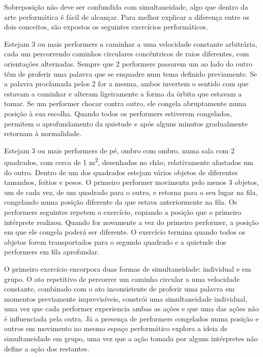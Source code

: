 \documentclass[../main.tex]{subfiles}
\begin{document}
Sobreposição não deve ser confundida com simultaneidade, algo que dentro da arte performática é fácil de alcançar. Para melhor explicar a diferença entre os dois conceitos, são expostos os seguintes exercícios performáticos.
\begin{performex}
    Estejam 3 ou mais performers a caminhar a uma velocidade constante arbitrária, cada um percorrendo caminhos circulares concêntricos de raios diferentes, com orientações alternadas. Sempre que 2 performers passarem um ao lado do outro têm de proferir uma palavra que se enquadre num tema definido previamente. Se a palavra proclamada pelos 2 for a mesma, ambos invertem o sentido com que estavam a caminhar e alteram ligeiramente a forma da órbita que estavam a tomar. Se um performer chocar contra outro, ele congela abruptamente numa posição à sua escolha. Quando todos os performers estiverem congelados, permitem o aprofundamento da quietude e após alguns minutos gradualmente retornam à normalidade.
\end{performex}
\begin{performex}
    Estejam 3 ou mais performers de pé, ombro com ombro, numa sala com 2 quadrados, com cerca de 1 m\textsuperscript{2}, desenhados no chão, relativamente afastados um do outro. Dentro de um dos quadrados estejam vários objetos de diferentes tamanhos, feitios e pesos. O primeiro performer movimenta pelo menos 3 objetos, um de cada vez, de um quadrado para o outro, e retorna para o seu lugar na fila, congelando numa posição diferente da que estava anteriormente na fila. Os performers seguintes repetem o exercício, copiando a posição que o primeiro intérprete realizou. Quando for novamente a vez do primeiro performer, a posição em que ele congela poderá ser diferente. O exercício termina quando todos os objetos forem transportados para o segundo quadrado e a quietude dos performers em fila aprofundar.
\end{performex}
O primeiro exercício encorpora duas formas de simultaneidade: individual e em grupo. O ato repetitivo de percorrer um caminho circular a uma velocidade constante, combinado com o ato inconsistente de proferir uma palavra em momentos previamente imprevisíveis, constrói uma simultaneidade individual, uma vez que cada performer experiencia ambas as ações e que uma das ações não é influenciada pela outra. Já a presença de performers congelados numa posição e outros em movimento no mesmo espaço performático explora a ideia de simultaneidade em grupo, uma vez que a ação tomada por alguns intérpretes não define a ação dos restantes.
\end{document}
